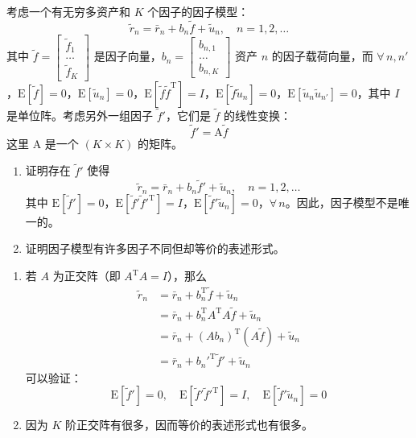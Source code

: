 \begin{problem}
 考虑一个有无穷多资产和 $K$ 个因子的因子模型：
\[
    \tilde{r}_{n}=\bar{r}_{n}+b_{n}\tilde{f}+\tilde{u}_{n},\quad n=1,2,\ldots
\]
其中 $\tilde{f}=\begin{bmatrix}\tilde{f}_{1} \\ \ldots \\ \tilde{f}_{K}\end{bmatrix}$ 是因子向量，$b_{n}=\begin{bmatrix}b_{n,1} \\ \ldots \\ b_{n,K}\end{bmatrix}$ 资产 $n$ 的因子载荷向量，而 $\forall\,n,n'$，$\mathrm{E}[\tilde{f}]=0$，$\mathrm{E}[\tilde{u}_{n}]=0$，$\mathrm{E}[\tilde{f}\tilde{f}^{\mathrm{T}}]=I$，$\mathrm{E}[\tilde{f}\tilde{u}_{n}]=0$，$\mathrm{E}[\tilde{u}_{n}\tilde{u}_{n'}]=0$，其中 $I$ 是单位阵。考虑另外一组因子 $\tilde{f}'$，它们是 $\tilde{f}$ 的线性变换：
\[
    \tilde{f}'=\mathrm{A}\tilde{f}
\]
这里 $\mathrm{A}$ 是一个 $(K\times K)$ 的矩阵。
\begin{enumerate}[label=(\alph*)]
    \item 证明存在 $\tilde{f}'$ 使得
    \[
        \tilde{r}_{n}=\bar{r}_{n}+b_{n}\tilde{f}'+\tilde{u}_{n},\quad n=1,2,\ldots
    \]
    其中 $\mathrm{E}[\tilde{f}']=0$，$\mathrm{E}[\tilde{f}'\tilde{f}'^{\mathrm{T}}]=I$，$\mathrm{E}[\tilde{f}'\tilde{u}_{n}]=0$，$\forall\,n$。因此，因子模型不是唯一的。
    \item 证明因子模型有许多因子不同但却等价的表述形式。
\end{enumerate}
\end{problem}
\begin{solution}
\begin{enumerate}[label=(\alph*)]
    \item 若 $A$ 为正交阵（即 $A^{\mathrm{T}}A=I$），那么
    \[
        \begin{aligned}
            \tilde{r}_{n}&=\bar{r}_{n}+b_{n}^{\mathrm{T}}\tilde{f}+\tilde{u}_{n}\\
            &=\bar{r}_{n}+b_{n}^{\mathrm{T}}A^{\mathrm{T}}A\tilde{f}+\tilde{u}_{n}\\
            &=\bar{r}_{n}+(Ab_{n})^{\mathrm{T}}(A\tilde{f})+\tilde{u}_{n}\\
            &=\bar{r}_{n}+b_{n}'^{\mathrm{T}}\tilde{f}'+\tilde{u}_{n}
        \end{aligned}
    \]
    可以验证：
    \[
        \mathrm{E}[\tilde{f}']=0,\quad\mathrm{E}[\tilde{f}'\tilde{f}'^{\mathrm{T}}]=I,\quad\mathrm{E}[\tilde{f}'\tilde{u}_{n}]=0
    \]
    \item 因为 $K$ 阶正交阵有很多，因而等价的表述形式也有很多。
\end{enumerate}
\end{solution}

